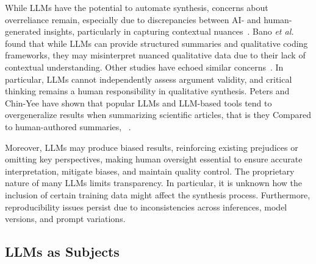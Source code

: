 While LLMs have the potential to automate synthesis, concerns about overreliance remain, especially due to discrepancies between AI- and human-generated insights, particularly in capturing contextual nuances~\cite{bano2023exploringqualitativeresearchusing}.
Bano \textit{et al.}~\cite{bano2023exploringqualitativeresearchusing} found that while LLMs can provide structured summaries and qualitative coding frameworks, they may misinterpret nuanced qualitative data due to their lack of contextual understanding. Other studies have echoed similar concerns~\cite{DBLP:journals/ase/BanoHZT24, barros2024largelanguagemodelqualitative, leça2024applicationsimplicationslargelanguage}. In particular, LLMs cannot independently assess argument validity, and critical thinking remains a human responsibility in qualitative synthesis.
Peters and Chin-Yee have shown that popular LLMs and LLM-based tools tend to overgeneralize results when summarizing scientific articles, that is they  Compared to human-authored summaries, ~\cite{peterschineyee2025generalizationbias}.

Moreover, LLMs may produce biased results, reinforcing existing prejudices or omitting key perspectives, making human oversight essential to ensure accurate interpretation, mitigate biases, and maintain quality control.
The proprietary nature of many LLMs limits transparency. In particular, it is unknown how the inclusion of certain training data might affect the synthesis process.
Furthermore, reproducibility issues persist due to inconsistencies across inferences, model versions, and prompt variations.



\subsection{LLMs as Subjects}

